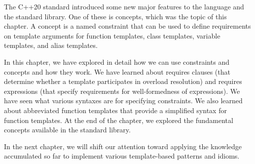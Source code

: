 The C++20 standard introduced some new major features to the language and the standard library. One of these is concepts, which was the topic of this chapter. A concept is a named constraint that can be used to define requirements on template arguments for function templates, class templates, variable templates, and alias templates.

In this chapter, we have explored in detail how we can use constraints and concepts and how they work. We have learned about requires clauses (that determine whether a template participates in overload resolution) and requires expressions (that specify requirements for well-formedness of expressions). We have seen what various syntaxes are for specifying constraints. We also learned about abbreviated function templates that provide a simplified syntax for function templates. At the end of the chapter, we explored the fundamental concepts available in the standard library.

In the next chapter, we will shift our attention toward applying the knowledge accumulated so far to implement various template-based patterns and idioms.